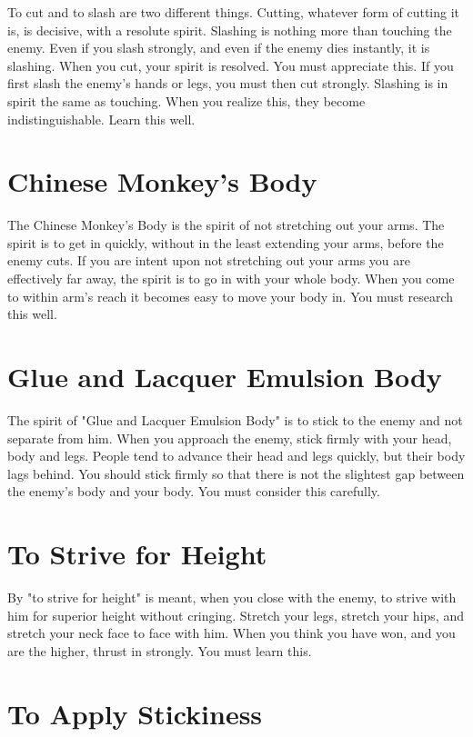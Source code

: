 To cut and to slash are two different things. Cutting, whatever form of cutting it is, is decisive, with a resolute spirit. Slashing is nothing more than touching the enemy. Even if you slash strongly, and even if the enemy dies instantly, it is slashing. When you cut, your spirit is resolved. You must appreciate this. If you first slash the enemy's hands or legs, you must then cut strongly. Slashing is in spirit the same as touching. When you realize this, they become indistinguishable. Learn this well.\\
\section{Chinese Monkey's Body}

The Chinese Monkey's Body is the spirit of not stretching out your arms. The spirit is to get in quickly, without in the least extending your arms, before the enemy cuts. If you are intent upon not stretching out your arms you are effectively far away, the spirit is to go in with your whole body. When you come to within arm's reach it becomes easy to move your body in. You must research this well.\\
\section{Glue and Lacquer Emulsion Body}

The spirit of "Glue and Lacquer Emulsion Body" is to stick to the enemy and not separate from him. When you approach the enemy, stick firmly with your head, body and legs. People tend to advance their head and legs quickly, but their body lags behind. You should stick firmly so that there is not the slightest gap between the enemy's body and your body. You must consider this carefully.\\
\section{To Strive for Height}

By "to strive for height" is meant, when you close with the enemy, to strive with him for superior height without cringing. Stretch your legs, stretch your hips, and stretch your neck face to face with him. When you think you have won, and you are the higher, thrust in strongly. You must learn this.\\
\section{To Apply Stickiness}

